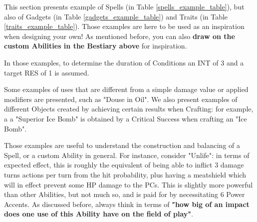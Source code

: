 \label{examples}

This section presents example of Spells (in Table \ref{spells_example_table}), but also of Gadgets (in Table \ref{gadgets_example_table}) and Traits (in Table \ref{traits_example_table}). Those examples are here to be used as an inspiration when designing your own! As mentioned before, you can also \textbf{draw on the custom Abilities in the Bestiary above} for inspiration.

In those examples, to determine the duration of Conditions an INT of 3 and a target RES of 1 is assumed.

Some examples of uses that are different from a simple damage value or applied modifiers are presented, such as "Douse in Oil". We also present examples of different Objects created by achieving certain results when Crafting: for example, a a "Superior Ice Bomb" is obtained by a Critical Success when crafting an "Ice Bomb".

Those examples are useful to understand the construction and balancing of a Spell, or a custom Ability in general. For instance, consider "Unlife": in terms of expected effect, this is roughly the equivalent of being able to inflict 3 damage  turns  actions per turn  from the hit probability, plus having a meatshield which will in effect prevent some HP damage to the PCs. This is slightly more powerful than other Abilities, but not much so, and is paid for by necessitating 6 Power Accents. As discussed before, always think in terms of \textbf{"how big of an impact does one use of this Ability have on the field of play"}.

